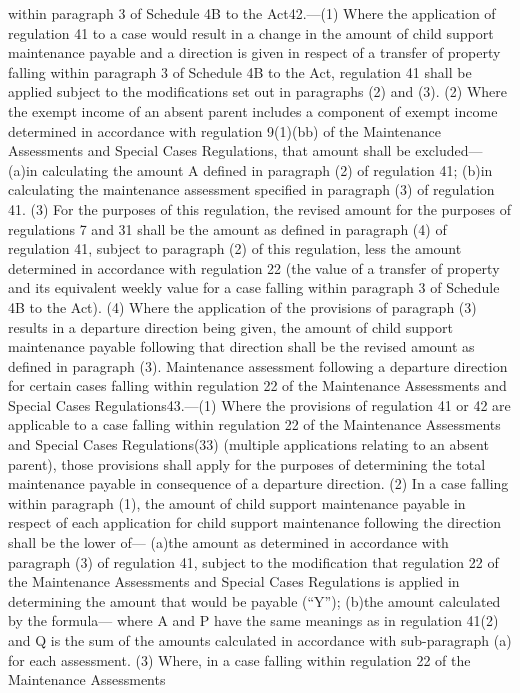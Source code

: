 \documentclass[a4paper]{article}
\begin{document}
within paragraph 3 of Schedule 4B to the Act42.—(1) Where the application of
regulation 41 to a case would result in a change in the amount of child support
maintenance payable and a direction is given in respect of a transfer of
property falling within paragraph 3 of Schedule 4B to the Act, regulation 41
shall be applied subject to the modifications set out in paragraphs (2) and (3).
(2) Where the exempt income of an absent parent includes a component of exempt
income determined in accordance with regulation 9(1)(bb) of the Maintenance
Assessments and Special Cases Regulations, that amount shall be excluded—
(a)in calculating the amount A defined in paragraph (2) of regulation 41;
(b)in calculating the maintenance assessment specified in paragraph (3) of
regulation 41.
(3) For the purposes of this regulation, the revised amount for the purposes of
regulations 7 and 31 shall be the amount as defined in paragraph (4) of
regulation 41, subject to paragraph (2) of this regulation, less the amount
determined in accordance with regulation 22 (the value of a transfer of property
and its equivalent weekly value for a case falling within paragraph 3 of
Schedule 4B to the Act).
(4) Where the application of the provisions of paragraph (3) results in a
departure direction being given, the amount of child support maintenance payable
following that direction shall be the revised amount as defined in paragraph
(3).
Maintenance assessment following a departure direction for certain cases falling
within regulation 22 of the Maintenance Assessments and Special Cases
Regulations43.—(1) Where the provisions of regulation 41 or 42 are applicable to
a case falling within regulation 22 of the Maintenance Assessments and Special
Cases Regulations(33) (multiple applications relating to an absent parent),
those provisions shall apply for the purposes of determining the total
maintenance payable in consequence of a departure direction.
(2) In a case falling within paragraph (1), the amount of child support
maintenance payable in respect of each application for child support maintenance
following the direction shall be the lower of—
(a)the amount as determined in accordance with paragraph (3) of regulation 41,
subject to the modification that regulation 22 of the Maintenance Assessments
and Special Cases Regulations is applied in determining the amount that would be
payable (“Y”);
(b)the amount calculated by the formula—
where A and P have the same meanings as in regulation 41(2) and Q is the sum of
the amounts calculated in accordance with sub-paragraph (a) for each assessment.
(3) Where, in a case falling within regulation 22 of the Maintenance Assessments
\end{document}
